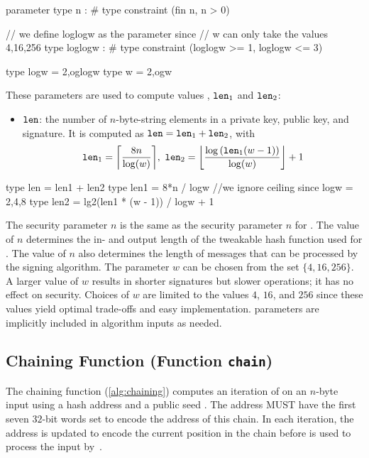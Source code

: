 \begin{code}
  parameter
    type n : #
    type constraint (fin n, n > 0)

    // we define loglogw as the parameter since
    // w can only take the values 4,16,256
    type loglogw : #
    type constraint (loglogw >= 1, loglogw <= 3)

  type logw = 2^^loglogw
  type w = 2^^logw
\end{code}

These parameters are used to compute values \len, $\texttt{len}_1$ and
$\texttt{len}_2$:
\begin{itemize}
  \item $\texttt{len}$: the number of $n$-byte-string elements in a \wotsp private
        key, public key, and signature. It is computed as $\texttt{len} =
        \texttt{len}_1 + \texttt{len}_2$, with
        \begin{equation*}
          \len_1 = \ceil*{\frac{8n}{\log(w)}},\
          \len_2 = \floor*{\frac{\log{(\len_1(w - 1))}}{\log(w)}} + 1
        \end{equation*}
\end{itemize}

\begin{code}
  type len = len1 + len2
  type len1 = 8*n / logw //we ignore ceiling since logw = 2,4,8
  type len2 = lg2(len1 * (w - 1)) / logw + 1
\end{code}

The security parameter $n$ is the same as the security parameter $n$ for \spx.
The value of $n$ determines the in- and output length of the tweakable hash
function used for \wotsp. The value of $n$ also determines
the length of messages that can be processed by the \wotsp signing algorithm.
The parameter $w$ can be chosen from the set $\{4, 16, 256\}$.
A larger value of $w$ results in shorter signatures but slower
operations; it has no effect on security.
Choices of $w$ are limited to the values $4$, $16$, and $256$ since these values
yield optimal trade-offs and easy implementation. \wotsp parameters are
implicitly included in algorithm inputs as needed.

\subsection{\wotsp Chaining Function (Function \texttt{chain})}
The chaining function (\autoref{alg:chaining}) computes an iteration of
\sphincsF on an $n$-byte input using a \wotsp hash address \adrs and a
public seed \pseed.
The address \adrs MUST have the first seven $32$-bit words set to encode the
address of this chain.  In each iteration, the address is updated to encode
the current position in the chain before \adrs is used to
process the input by~\sphincsF.

